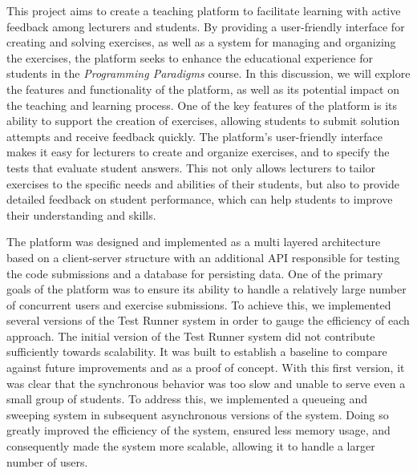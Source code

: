 This project aims to create a teaching platform to facilitate learning with active feedback among lecturers and students. 
By providing a user-friendly interface for creating and solving exercises, as well as a system for managing and organizing the exercises, the platform seeks to enhance the educational experience for students in the \textit{Programming Paradigms} course. 
In this discussion, we will explore the features and functionality of the platform, as well as its potential impact on the teaching and learning process.
One of the key features of the platform is its ability to support the creation of exercises, allowing students to submit solution attempts and receive feedback quickly.
The platform's user-friendly interface makes it easy for lecturers to create and organize exercises, and to specify the tests that evaluate student answers. This not only allows lecturers to tailor exercises to the specific needs and abilities of their students, but also to provide detailed feedback on student performance, which can help students to improve their understanding and skills.

The platform was designed and implemented as a multi layered architecture based on a client-server structure with an additional API responsible for testing the code submissions and a database for persisting data. 
One of the primary goals of the platform was to ensure its ability to handle a relatively large number of concurrent users and exercise submissions. 
To achieve this, we implemented several versions of the Test Runner system in order to gauge the efficiency of each approach. 
The initial version of the Test Runner system did not contribute sufficiently towards scalability.
It was built to establish a baseline to compare against future improvements and as a proof of concept. With this first version, it was clear that the synchronous behavior was too slow and unable to serve even a small group of students.
To address this, we implemented a queueing and sweeping system in subsequent asynchronous versions of the system. Doing so greatly improved the efficiency of the system, ensured less memory usage, and consequently made the system more scalable, allowing it to handle a larger number of users. 

